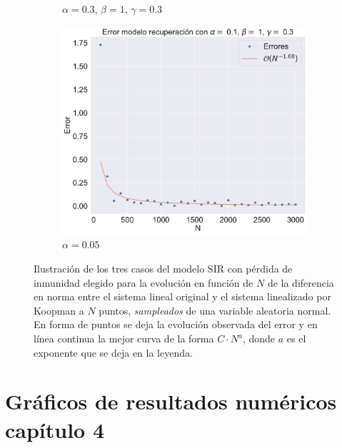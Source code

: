 \begin{figure}[h]
\begin{subfigure}[b]{0.32\textwidth}
        \caption{$\alpha=0.3$, $\beta=1$, $\gamma=0.3$}
    \end{subfigure}
    \hfill
    \begin{subfigure}[b]{0.32\textwidth}
        \centering
        \includegraphics[width=\textwidth]{img/content/chapter3/SIR_rec3Errors.pdf}
        \caption{$\alpha=0.05$}
    \end{subfigure}
    \caption{Ilustración de los tres casos del modelo SIR con pérdida de inmunidad elegido para la evolución en función de $N$ de la diferencia en norma entre el sistema lineal original y el sistema linealizado por Koopman a $N$ puntos,  \textit{sampleados} de una variable aleatoria normal. En forma de puntos se deja la evolución observada del error y en línea continua la mejor curva de la forma $C \cdot N^{a}$, donde $a$ es el exponente que se deja en la leyenda.}
    \label{fig:ErrorSIR_rec}
\end{figure}


\chapter{Gráficos de resultados numéricos capítulo 4}

\subsection{}

